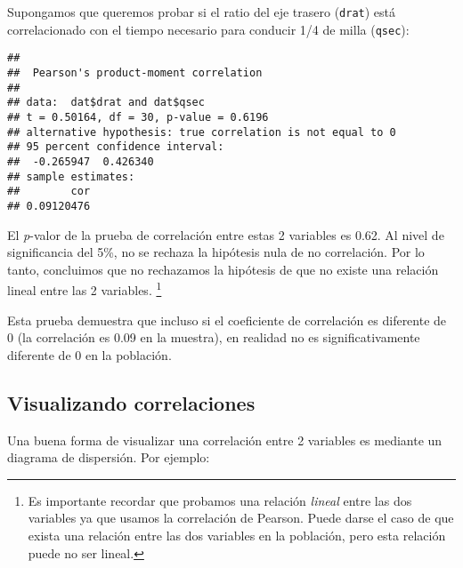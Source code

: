 \documentclass[
]{book}
\newenvironment{Shaded}{\begin{snugshade}}{\end{snugshade}}
\newcommand{\CommentTok}[1]{\textcolor[rgb]{0.56,0.35,0.01}{\textit{#1}}}
\newcommand{\KeywordTok}[1]{\textcolor[rgb]{0.13,0.29,0.53}{\textbf{#1}}}
\newcommand{\NormalTok}[1]{#1}
\newcommand{\OperatorTok}[1]{\textcolor[rgb]{0.81,0.36,0.00}{\textbf{#1}}}
\newcommand{\StringTok}[1]{\textcolor[rgb]{0.31,0.60,0.02}{#1}}
\begin{document}
Supongamos que queremos probar si el ratio del eje trasero (\texttt{drat}) está correlacionado con el tiempo necesario para conducir 1/4 de milla (\texttt{qsec}):

\begin{Shaded}
\end{Shaded}

\begin{verbatim}
## 
##  Pearson's product-moment correlation
## 
## data:  dat$drat and dat$qsec
## t = 0.50164, df = 30, p-value = 0.6196
## alternative hypothesis: true correlation is not equal to 0
## 95 percent confidence interval:
##  -0.265947  0.426340
## sample estimates:
##        cor 
## 0.09120476
\end{verbatim}

El \emph{p}-valor de la prueba de correlación entre estas 2 variables es 0.62. Al nivel de significancia del 5\%, no se rechaza la hipótesis nula de no correlación. Por lo tanto, concluimos que no rechazamos la hipótesis de que no existe una relación lineal entre las 2 variables. \footnote{Es importante recordar que probamos una relación \emph{lineal} entre las dos variables ya que usamos la correlación de Pearson. Puede darse el caso de que exista una relación entre las dos variables en la población, pero esta relación puede no ser lineal.}

Esta prueba demuestra que incluso si el coeficiente de correlación es diferente de 0 (la correlación es 0.09 en la muestra), en realidad no es significativamente diferente de 0 en la población.

\hypertarget{visualizando-correlaciones}{%
\subsection{Visualizando correlaciones}\label{visualizando-correlaciones}}

Una buena forma de visualizar una correlación entre 2 variables es mediante un diagrama de dispersión. Por ejemplo:

\begin{Shaded}
\end{Shaded}
\end{document}

